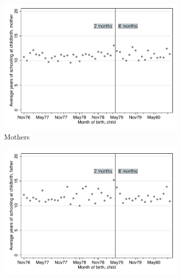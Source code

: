 \documentclass[a4paper ]{article}
\begin{document}
\begin{landscape}
\begin{figure}[p]
\end{figure}

\end{landscape}



\clearpage






 \vspace*{\fill}
\begin{figure}[h]
	\centering
	\begin{subfigure}[t]{0.48\textwidth}
		\centering
		\includegraphics[width=0.99\textwidth]{../../analysis/graphs/SOEP/Meduc}
		\caption{Mothers}		
	\end{subfigure}
	\quad
	\begin{subfigure}[t]{0.48\textwidth}
		\centering
		\includegraphics[width=0.99\textwidth]{../../analysis/graphs/SOEP/Feduc}

\end{subfigure}
\end{figure}
\end{document}

